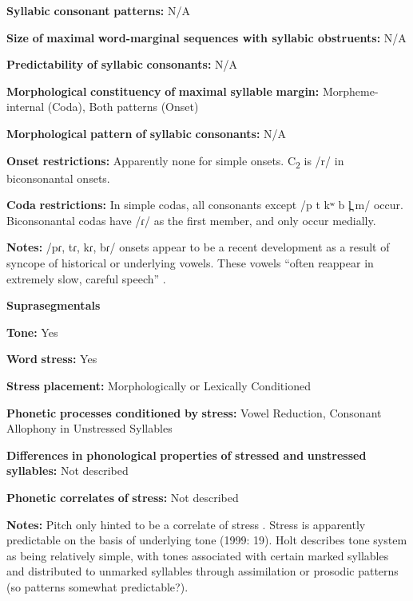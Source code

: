 \begin{styleBody}
\textbf{Syllabic} \textbf{consonant} \textbf{patterns:} N/A

\textbf{Size} \textbf{of} \textbf{maximal} \textbf{word{}-marginal sequences with syllabic obstruents:} N/A

\textbf{Predictability} \textbf{of} \textbf{syllabic} \textbf{consonants:} N/A

\textbf{Morphological} \textbf{constituency} \textbf{of} \textbf{maximal} \textbf{syllable} \textbf{margin:} Morpheme-internal (Coda), Both patterns (Onset)

\textbf{Morphological} \textbf{pattern} \textbf{of} \textbf{syllabic} \textbf{consonants:} N/A

\textbf{Onset} \textbf{restrictions:} Apparently none for simple onsets. C\textsubscript{2} is /r/ in biconsonantal onsets.

\textbf{Coda} \textbf{restrictions:} In simple codas, all consonants except /p t kʷ b l̪ m/ occur. Biconsonantal codas have /ɾ/ as the first member, and only occur medially.

\textbf{Notes:} /pɾ, tɾ, kɾ, bɾ/ onsets appear to be a recent development as a result of syncope of historical or underlying vowels. These vowels “often reappear in extremely slow, careful speech” \citep[20]{Holt1999}.

\textbf{Suprasegmentals}

\textbf{Tone:} Yes

\textbf{Word} \textbf{stress:} Yes

\textbf{Stress} \textbf{placement:} Morphologically or Lexically Conditioned

\textbf{Phonetic} \textbf{processes} \textbf{conditioned} \textbf{by} \textbf{stress:} Vowel Reduction, Consonant Allophony in Unstressed Syllables

\textbf{Differences} \textbf{in} \textbf{phonological} \textbf{properties} \textbf{of} \textbf{stressed} \textbf{and} \textbf{unstressed} \textbf{syllables:} Not described

\textbf{Phonetic} \textbf{correlates} \textbf{of} \textbf{stress:} Not described

\textbf{Notes:} Pitch only hinted to be a correlate of stress \citep[238]{Holt1986}. Stress is apparently predictable on the basis of underlying tone (1999: 19). Holt describes tone system as being relatively simple, with tones associated with certain marked syllables and distributed to unmarked syllables through assimilation or prosodic patterns (so patterns somewhat predictable?).


\end{styleBody}
